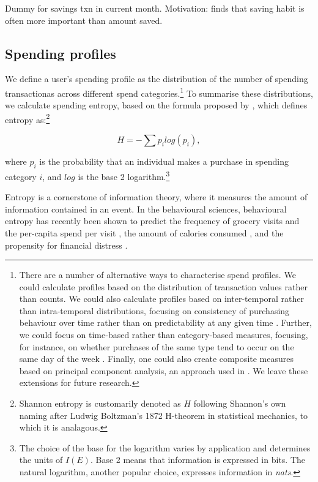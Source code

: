 Dummy for savings txn in current month. Motivation: \citet{mps2018building} finds that
saving habit is often more important than amount saved.


\subsection{Spending profiles}%
\label{sub:spending_profiles}

We define a user's spending profile as the distribution of the number of
spending transactionas across different spend categories.\footnote{There are a
    number of alternative ways to characterise spend profiles. We could
    calculate profiles based on the distribution of transaction values rather
    than counts. We could also calculate profiles based on inter-temporal
    rather than intra-temporal distributions, focusing on consistency of
    purchasing behaviour over time rather than on predictability at any given
    time \citep{krumme2013predictability}. Further, we could focus on
    time-based rather than category-based measures, focusing, for instance, on
    whether purchases of the same type tend to occur on the same day of the
    week \citep{guidotti2015behavioral}. Finally, one could also create
composite measures based on principal component analysis, an approach used in
\citet{eagle2010network}. We leave these extensions for future research.} To
summarise these distributions, we calculate spending entropy, based on the
formula proposed by \citet{shannon1948mathematical}, which defines entropy
as:\footnote{Shannon entropy is customarily denoted as $H$ following Shannon's
    own naming after Ludwig Boltzman's 1872 H-theorem in statistical mechanics,
to which it is analagous.}

\begin{equation}
\label{equ:entropy}
    H = -\sum{p_i}log(p_i),
\end{equation}

\noindent where $p_i$ is the probability that an individual makes a purchase in spending
category $i$, and $log$ is the base 2 logarithm.\footnote{The choice of the
    base for the logarithm varies by application and determines the units of
    $I(E)$. Base 2 means that information is expressed in bits. The natural
logarithm, another popular choice, expresses information in \textit{nats}.}

Entropy is a cornerstone of information theory, where it measures the amount of
information contained in an event. In the behavioural sciences, behavioural
entropy has recently been shown to predict the frequency of grocery visits and
the per-capita spend per visit \citep{guidotti2015behavioral}, the amount of
calories consumed \citep{skatova2019those}, and the propensity for financial
distress \citep{muggleton2020evidence}.

